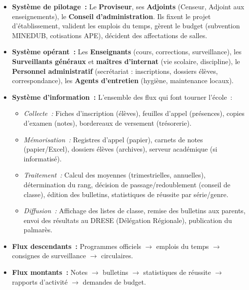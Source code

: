 \documentclass[11pt]{article}
\begin{document}
\begin{exemplebox}
\begin{itemize}
    \item \textbf{Système de pilotage~:} Le \textbf{Proviseur}, ses \textbf{Adjoints} (Censeur, Adjoint aux enseignements), le \textbf{Conseil d'administration}. Ils fixent le projet d'établissement, valident les emplois du temps, gèrent le budget (subvention MINEDUB, cotisations APE), décident des affectations de salles.
    \item \textbf{Système opérant~:} Les \textbf{Enseignants} (cours, corrections, surveillance), les \textbf{Surveillants généraux} et \textbf{maîtres d'internat} (vie scolaire, discipline), le \textbf{Personnel administratif} (secrétariat : inscriptions, dossiers élèves, correspondance), les \textbf{Agents d'entretien} (hygiène, maintenance locaux).
    \item \textbf{Système d'information~:} L'ensemble des flux qui font tourner l'école~:
    \begin{itemize}
        \item \emph{Collecte~:} Fiches d'inscription (élèves), feuilles d'appel (présences), copies d'examen (notes), bordereaux de versement (trésorerie).
        \item \emph{Mémorisation~:} Registres d'appel (papier), carnets de notes (papier/Excel), dossiers élèves (archives), serveur académique (si informatisé).
        \item \emph{Traitement~:} Calcul des moyennes (trimestrielles, annuelles), détermination du rang, décision de passage/redoublement (conseil de classe), édition des bulletins, statistiques de réussite par série/genre.
        \item \emph{Diffusion~:} Affichage des listes de classe, remise des bulletins aux parents, envoi des résultats au DRESE (Délégation Régionale), publication du palmarès.
    \end{itemize}
    \item \textbf{Flux descendants~:} Programmes officiels $\rightarrow$ emplois du temps $\rightarrow$ consignes de surveillance $\rightarrow$ circulaires.
    \item \textbf{Flux montants~:} Notes $\rightarrow$ bulletins $\rightarrow$ statistiques de réussite $\rightarrow$ rapports d'activité $\rightarrow$ demandes de budget.
\end{itemize}
\end{exemplebox}
\end{document}
